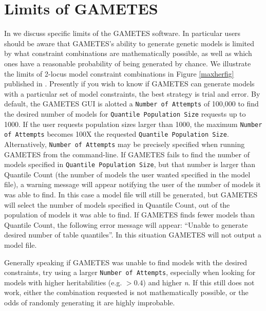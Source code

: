 \documentclass{report}
\begin{document}
\section{Limits of GAMETES} 
In \cite{urbanowicz2012gametes} we discuss specific limits of the GAMETES software.  In particular users should be aware that GAMETES's ability to generate genetic models is limited by what constraint combinations are mathematically possible, as well as which ones have a reasonable probability of being generated by chance.  We illustrate the limits of 2-locus model constraint combinations in Figure \ref{maxherfig} published in \cite{urbanowicz2012gametes}.  Presently if you wish to know if GAMETES can generate models with a particular set of model constraints, the best strategy is trial and error.  By default, the GAMETES GUI is alotted a \texttt{Number of Attempts} of 100,000 to find the desired number of models for \texttt{Quantile Population Size} requests up to 1000.  If the user requests population sizes larger than 1000, the maximum \texttt{Number of Attempts} becomes 100X the requested \texttt{Quantile Population Size}.  Alternatively, \texttt{Number of Attempts} may be precisely specified when running GAMETES from the command-line.  If GAMETES fails to find the number of models specified in \texttt{Quantile Population Size}, but that number is larger than {Quantile Count} (the number of models the user wanted specified in the model file), a warning message will appear notifying the user of the number of models it was able to find.  In this case a model file will still be generated, but GAMETES will select the number of models specified in {Quantile Count}, out of the population of models it was able to find.  If GAMETES finds fewer models than {Quantile Count}, the following error message will appear: ``Unable to generate desired number of table quantiles''.  In this situation GAMETES will not output a model file.

Generally speaking if GAMETES was unable to find models with the desired constraints, try using a larger \texttt{Number of Attempts}, especially when looking for models with higher heritabilities (e.g. $> 0.4$) and higher \emph{n}.  If this still does not work, either the combination requested is not mathematically possible, or the odds of randomly generating it are highly improbable.
\end{document}
